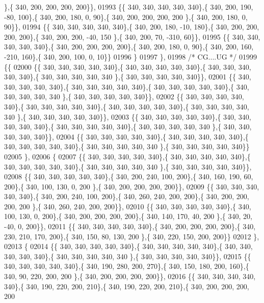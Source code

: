 \begin{DoxyCode}
      \},\{ 340, 200, 200, 200, 200\}\},
01993 \{\{ 340, 340, 340, 340, 340\},\{ 340, 200, 190, -80, 100\},\{ 340, 200, 180,   0,  90\},\{ 340, 200, 200, 200, 200
      \},\{ 340, 200, 180,   0,  90\}\},
01994 \{\{ 340, 340, 340, 340, 340\},\{ 340, 200, 180, -10, 180\},\{ 340, 200, 200, 200, 200\},\{ 340, 200, 200, -40, 150
      \},\{ 340, 200,  70, -310,  60\}\},
01995 \{\{ 340, 340, 340, 340, 340\},\{ 340, 200, 200, 200, 200\},\{ 340, 200, 180,   0,  90\},\{ 340, 200, 160, -210, 
      160\},\{ 340, 200, 100,   0,  10\}\}
01996 \}
01997 \},
01998 \textcolor{comment}{/* CG....UG */}
01999 \{\{
02000 \{\{ 340, 340, 340, 340, 340\},\{ 340, 340, 340, 340, 340\},\{ 340, 340, 340, 340, 340\},\{ 340, 340, 340, 340, 340
      \},\{ 340, 340, 340, 340, 340\}\},
02001 \{\{ 340, 340, 340, 340, 340\},\{ 340, 340, 340, 340, 340\},\{ 340, 340, 340, 340, 340\},\{ 340, 340, 340, 340, 340
      \},\{ 340, 340, 340, 340, 340\}\},
02002 \{\{ 340, 340, 340, 340, 340\},\{ 340, 340, 340, 340, 340\},\{ 340, 340, 340, 340, 340\},\{ 340, 340, 340, 340, 340
      \},\{ 340, 340, 340, 340, 340\}\},
02003 \{\{ 340, 340, 340, 340, 340\},\{ 340, 340, 340, 340, 340\},\{ 340, 340, 340, 340, 340\},\{ 340, 340, 340, 340, 340
      \},\{ 340, 340, 340, 340, 340\}\},
02004 \{\{ 340, 340, 340, 340, 340\},\{ 340, 340, 340, 340, 340\},\{ 340, 340, 340, 340, 340\},\{ 340, 340, 340, 340, 340
      \},\{ 340, 340, 340, 340, 340\}\}
02005 \},
02006 \{
02007 \{\{ 340, 340, 340, 340, 340\},\{ 340, 340, 340, 340, 340\},\{ 340, 340, 340, 340, 340\},\{ 340, 340, 340, 340, 340
      \},\{ 340, 340, 340, 340, 340\}\},
02008 \{\{ 340, 340, 340, 340, 340\},\{ 340, 200, 240, 100, 200\},\{ 340, 160, 190,  60, 200\},\{ 340, 100, 130,   0, 200
      \},\{ 340, 200, 200, 200, 200\}\},
02009 \{\{ 340, 340, 340, 340, 340\},\{ 340, 200, 240, 100, 200\},\{ 340, 260, 240, 200, 200\},\{ 340, 200, 200, 200, 200
      \},\{ 340, 260, 240, 200, 200\}\},
02010 \{\{ 340, 340, 340, 340, 340\},\{ 340, 100, 130,   0, 200\},\{ 340, 200, 200, 200, 200\},\{ 340, 140, 170,  40, 200
      \},\{ 340,  20, -40,   0, 200\}\},
02011 \{\{ 340, 340, 340, 340, 340\},\{ 340, 200, 200, 200, 200\},\{ 340, 230, 210, 170, 200\},\{ 340, 150,  80, 130, 200
      \},\{ 340, 220, 150, 200, 200\}\}
02012 \},
02013 \{
02014 \{\{ 340, 340, 340, 340, 340\},\{ 340, 340, 340, 340, 340\},\{ 340, 340, 340, 340, 340\},\{ 340, 340, 340, 340, 340
      \},\{ 340, 340, 340, 340, 340\}\},
02015 \{\{ 340, 340, 340, 340, 340\},\{ 340, 190, 280, 200, 270\},\{ 340, 150, 180, 200, 160\},\{ 340,  90, 220, 200, 200
      \},\{ 340, 200, 200, 200, 200\}\},
02016 \{\{ 340, 340, 340, 340, 340\},\{ 340, 190, 220, 200, 210\},\{ 340, 190, 220, 200, 210\},\{ 340, 200, 200, 200, 200

\end{DoxyCode}
